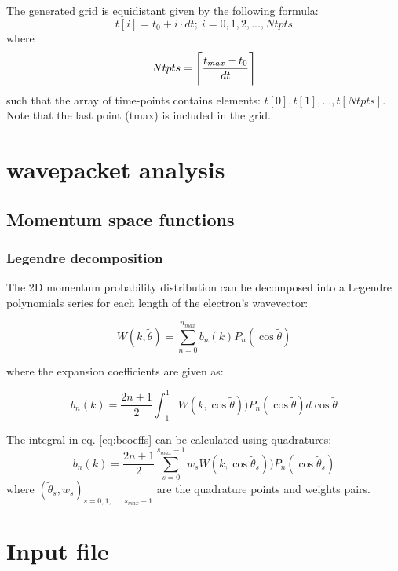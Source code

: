 \documentclass[a4paper,american,floatfix,pdftex,superscriptaddress,twoside,%
aps,pra,
linenumbers,%
reprint,%
]{revtex4-2}%
\DeclarePairedDelimiter{\ceil}{\lceil}{\rceil}
\begin{document}
The generated grid is equidistant given by the following formula:
\begin{equation}
t[i] = t_0 + i \cdot dt ;\ i=0,1,2,...,Ntpts
\end{equation}
where 
\begin{equation}
Ntpts = \ceil[\Bigg]{\frac{t_{max}-t_0}{dt}}
\end{equation}
such that the array of time-points contains elements: $t[0],t[1],...,t[Ntpts]$.
Note that the last point (tmax) is included in the grid. 



\section{wavepacket analysis}

\subsection{Momentum space functions}

\subsubsection{Legendre decomposition}
The 2D momentum probability distribution can be decomposed into a Legendre polynomials series for each length of the electron's wavevector:

\begin{equation}
W(k,\tilde{\theta}) = \sum_{n=0}^{n_{max}} b_n(k)P_n(\cos\tilde{\theta})
\end{equation}

where the expansion coefficients are given as:

\begin{equation}
 b_n(k) = \frac{2n+1}{2}\int_{-1}^{1} W(k,\cos\tilde{\theta}))P_n(\cos\tilde{\theta}) d\cos\tilde{\theta}
 \label{eq:bcoeffs}
\end{equation}

The integral in eq. \ref{eq:bcoeffs} can be calculated using quadratures:
\begin{equation}
b_n(k) =  \frac{2n+1}{2}\sum_{s=0}^{s_{max}-1} w_s W(k,\cos\tilde{\theta}_s))P_n(\cos\tilde{\theta}_s)
\label{eq:bcoeffs_quads}
\end{equation}
where $(\tilde{\theta}_s,w_s)_{s=0,1,....,s_{max}-1}$ are the quadrature points and weights pairs.

\section{Input file}
\end{document}
